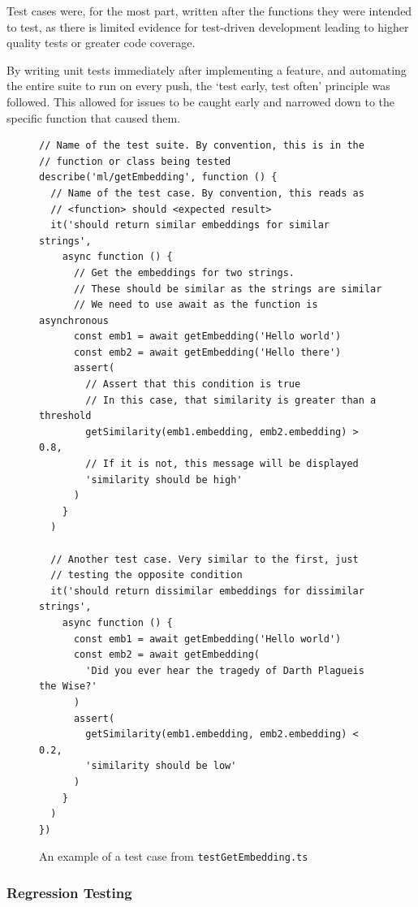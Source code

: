 Test cases were, for the most part, written after the functions they were intended to test,
as there is limited evidence for test-driven development leading to higher
quality tests or greater code coverage.~\cite{tosun_effectiveness_2018,madeyski_impact_2010}

By writing unit tests immediately after implementing a feature, and automating the entire suite to run
on every push, the \enquote*{test early, test often} principle was followed. This allowed for
issues to be caught early and narrowed down to the specific function that caused them.~\cite{olan_unit_2003}

\begin{figure}[p]
    \caption{\label{fig:test_case}An example of a test case from \texttt{testGetEmbedding.ts}}
    \begin{verbatim}
// Name of the test suite. By convention, this is in the
// function or class being tested
describe('ml/getEmbedding', function () {
  // Name of the test case. By convention, this reads as
  // <function> should <expected result>
  it('should return similar embeddings for similar strings',
    async function () {
      // Get the embeddings for two strings.
      // These should be similar as the strings are similar
      // We need to use await as the function is asynchronous
      const emb1 = await getEmbedding('Hello world')
      const emb2 = await getEmbedding('Hello there')
      assert(
        // Assert that this condition is true
        // In this case, that similarity is greater than a threshold
        getSimilarity(emb1.embedding, emb2.embedding) > 0.8,
        // If it is not, this message will be displayed
        'similarity should be high'
      )
    }
  )

  // Another test case. Very similar to the first, just
  // testing the opposite condition
  it('should return dissimilar embeddings for dissimilar strings',
    async function () {
      const emb1 = await getEmbedding('Hello world')
      const emb2 = await getEmbedding(
        'Did you ever hear the tragedy of Darth Plagueis the Wise?'
      )
      assert(
        getSimilarity(emb1.embedding, emb2.embedding) < 0.2,
        'similarity should be low'
      )
    }
  )
})
    \end{verbatim}
\end{figure}

\subsubsection{Regression Testing}

